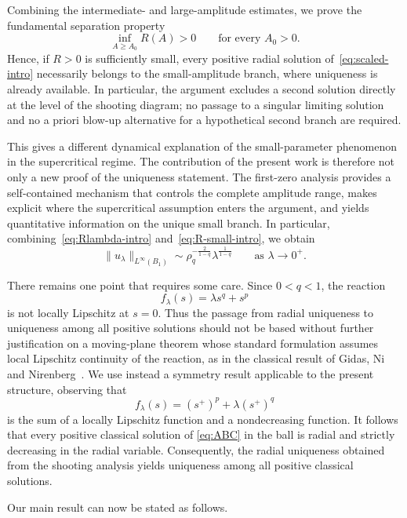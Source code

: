 \documentclass[11pt]{article}
\newcommand{\add}[1]{{\color{blue}#1}}
\theoremstyle{definition}
\begin{document}
Combining the intermediate- and large-amplitude estimates, we prove
the fundamental separation property
\begin{equation}
\label{eq:separation-intro}
\inf_{A\geq A_0}R(A)>0
\qquad
\text{for every }A_0>0.
\end{equation}
Hence, if $R>0$ is sufficiently small, every positive radial solution
of~\eqref{eq:scaled-intro} necessarily belongs to the small-amplitude
branch, where uniqueness is already available. In particular, the
argument excludes a second solution directly at the level of the
shooting diagram; no passage to a singular limiting solution and no
a priori blow-up alternative for a hypothetical second branch are
required.

This gives a different dynamical explanation of the small-parameter
phenomenon in the supercritical regime. The contribution of the
present work is therefore not only a new proof of the uniqueness
statement. The first-zero analysis provides a self-contained
mechanism that controls the complete amplitude range, makes explicit
where the supercritical assumption enters the argument, and yields
quantitative information on the unique small branch. In particular,
combining~\eqref{eq:Rlambda-intro} and~\eqref{eq:R-small-intro}, we
obtain
\begin{equation}
\label{eq:asymptotic-intro}
\|u_\lambda\|_{L^\infty(B_1)}
\sim
\rho_q^{-\frac{2}{1-q}}
\lambda^{\frac1{1-q}}
\qquad\text{as }\lambda\to0^+.
\end{equation}

There remains one point that requires some care. Since $0<q<1$, the
reaction
\[
f_\lambda(s)=\lambda s^q+s^p
\]
is not locally Lipschitz at $s=0$. Thus the passage from radial
uniqueness to uniqueness among all positive solutions should not be
based without further justification on a moving-plane theorem whose
standard formulation assumes local Lipschitz continuity of the
reaction\add{, as in the classical result of Gidas, Ni and
Nirenberg~\cite{GNN}}. We use instead a symmetry result applicable to the present
structure, observing that
\[
f_\lambda(s)
=
(s^+)^p+\lambda(s^+)^q
\]
is the sum of a locally Lipschitz function and a nondecreasing
function. It follows that every positive classical solution of
\eqref{eq:ABC} in the ball is radial and strictly decreasing in the
radial variable. Consequently, the radial uniqueness obtained from
the shooting analysis yields uniqueness among all positive classical
solutions.

Our main result can now be stated as follows.
\end{document}
